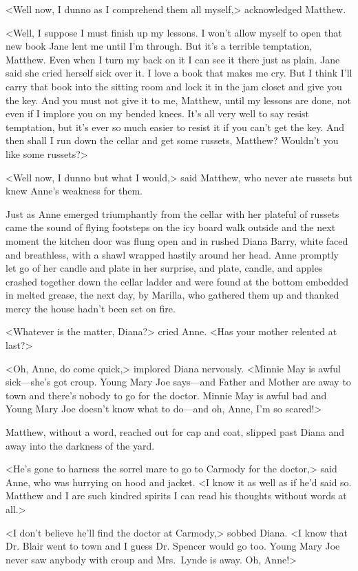 <Well now, I dunno as I comprehend them all myself,> acknowledged Matthew.

<Well, I suppose I must finish up my lessons. I won't allow myself to open that new book Jane lent me until I'm through. But it's a terrible temptation, Matthew. Even when I turn my back on it I can see it there just as plain. Jane said she cried herself sick over it. I love a book that makes me cry. But I think I'll carry that book into the sitting room and lock it in the jam closet and give you the key. And you must not give it to me, Matthew, until my lessons are done, not even if I implore you on my bended knees. It's all very well to say resist temptation, but it's ever so much easier to resist it if you can't get the key. And then shall I run down the cellar and get some russets, Matthew? Wouldn't you like some russets?>

<Well now, I dunno but what I would,> said Matthew, who never ate russets but knew Anne's weakness for them.

Just as Anne emerged triumphantly from the cellar with her plateful of russets came the sound of flying footsteps on the icy board walk outside and the next moment the kitchen door was flung open and in rushed Diana Barry, white faced and breathless, with a shawl wrapped hastily around her head. Anne promptly let go of her candle and plate in her surprise, and plate, candle, and apples crashed together down the cellar ladder and were found at the bottom embedded in melted grease, the next day, by Marilla, who gathered them up and thanked mercy the house hadn't been set on fire.

<Whatever is the matter, Diana?> cried Anne. <Has your mother relented at last?>

<Oh, Anne, do come quick,> implored Diana nervously. <Minnie May is awful sick—she's got croup. Young Mary Joe says—and Father and Mother are away to town and there's nobody to go for the doctor. Minnie May is awful bad and Young Mary Joe doesn't know what to do—and oh, Anne, I'm so scared!>

Matthew, without a word, reached out for cap and coat, slipped past Diana and away into the darkness of the yard.

<He's gone to harness the sorrel mare to go to Carmody for the doctor,> said Anne, who was hurrying on hood and jacket. <I know it as well as if he'd said so. Matthew and I are such kindred spirits I can read his thoughts without words at all.>

<I don't believe he'll find the doctor at Carmody,> sobbed Diana. <I know that Dr. Blair went to town and I guess Dr. Spencer would go too. Young Mary Joe never saw anybody with croup and Mrs.~Lynde is away. Oh, Anne!>

